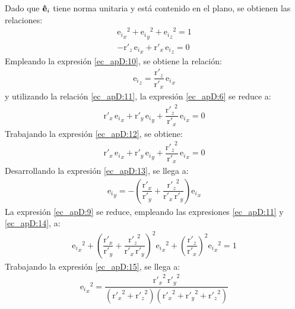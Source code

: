 Dado que $\bm{\mathbf{\hat{e}}}_i$ tiene norma unitaria y está contenido en el plano, se obtienen las relaciones:
\begin{gather}
{{\text{e}_i}_x}^2 + {{\text{e}_i}_y}^2 + {{\text{e}_i}_z}^2 = 1
\label{ec_apD:9}\\
-{\text{r}'}_{\!z}\,{\text{e}_i}_x + {\text{r}'}_{\!x}\,{\text{e}_i}_z = 0
\label{ec_apD:10}
\end{gather}
Empleando la expresión \eqref{ec_apD:10}, se obtiene la relación:
\begin{align}
{\text{e}_i}_z = \dfrac{{\text{r}'}_{\!z}}{{\text{r}'}_{\!x}}\,{\text{e}_i}_x
\label{ec_apD:11}
\end{align}
y utilizando la relación \eqref{ec_apD:11}, la expresión \eqref{ec_apD:6} se reduce a:
\begin{align}
{\text{r}'}_{\!x}\,{\text{e}_i}_x + {\text{r}'}_{\!y}\,{\text{e}_i}_y + \dfrac{{{\text{r}'}_{\!z}}^2}{{\text{r}'}_{\!x}}\,{\text{e}_i}_x = 0
\label{ec_apD:12}
\end{align}
Trabajando la expresión \eqref{ec_apD:12}, se obtiene:
\begin{align}
{\text{r}'}_{\!x}\,{\text{e}_i}_x + {\text{r}'}_{\!y}\,{\text{e}_i}_y + \dfrac{{{\text{r}'}_{\!z}}^2}{{\text{r}'}_{\!x}}\,{\text{e}_i}_x = 0
\label{ec_apD:13}
\end{align}
Desarrollando la expresión \eqref{ec_apD:13}, se llega a:
\begin{align}
{\text{e}_i}_y  = -\left(\dfrac{{\text{r}'}_{\!x}}{{\text{r}'}_{\!y}} + \dfrac{{{\text{r}'}_{\!z}}^2}{{\text{r}'}_{\!x}\,{\text{r}'}_{\!y}}\right){\text{e}_i}_x
\label{ec_apD:14}
\end{align}
La expresión \eqref{ec_apD:9} se reduce, empleando las expresiones \eqref{ec_apD:11} y \eqref{ec_apD:14}, a:
\begin{align}
{{\text{e}_i}_x}^2 + \left(\dfrac{{\text{r}'}_{\!x}}{{\text{r}'}_{\!y}} + \dfrac{{{\text{r}'}_{\!z}}^2}{{\text{r}'}_{\!x}\,{\text{r}'}_{\!y}}\right)^2\!{{\text{e}_i}_x}^2 + \left(\dfrac{{\text{r}'}_{\!z}}{{\text{r}'}_{\!x}}\right)^2\!{{\text{e}_i}_x}^2 = 1
\label{ec_apD:15}
\end{align}
Trabajando la expresión \eqref{ec_apD:15}, se llega a:
\begin{align}
{{\text{e}_i}_x}^2 = \dfrac{{{\text{r}'}_{\!x}}^2\,{{\text{r}'}_{\!y}}^2}{\left({{\text{r}'}_{\!x}}^2 + {{\text{r}'}_{\!z}}^2\right)\left(  {{\text{r}'}_{\!x}}^2 + {{\text{r}'}_{\!y}}^2 + {{\text{r}'}_{\!z}}^2\right)}
\label{ec_apD:16}
\end{align}
